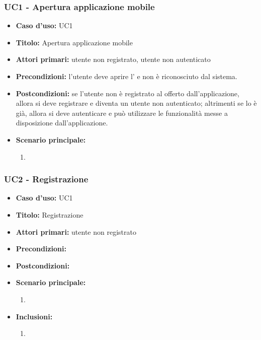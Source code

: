 \documentclass[casi-duso]{subfiles}
\begin{document}
\subsubsection{UC1 - Apertura applicazione mobile}
\label{subsub:uc1utente}
\begin{itemize}
  \item \textbf{Caso d’uso:} UC1 
  \item \textbf{Titolo:} Apertura applicazione mobile
  \item \textbf{Attori primari:} utente non registrato, utente non autenticato
  \item \textbf{Precondizioni:} l'utente deve aprire l' e non è riconosciuto dal sistema.
  \item \textbf{Postcondizioni:} se l'utente non è registrato al  offerto dall'applicazione, allora si deve registrare e diventa un utente non autenticato; 
  altrimenti se lo è già, allora si deve autenticare e può utilizzare le funzionalità messe a disposizione dall'applicazione. 
  \item \textbf{Scenario principale:} 
  \begin{enumerate}
    \item 
  \end{enumerate}  
\end{itemize}

\subsubsection{UC2 - Registrazione}
\label{subsub:uc2utente}
\begin{itemize}
  \item \textbf{Caso d’uso:} UC1 
  \item \textbf{Titolo:} Registrazione
  \item \textbf{Attori primari:} utente non registrato
  \item \textbf{Precondizioni:} 
  \item \textbf{Postcondizioni:} 
  \item \textbf{Scenario principale:} 
  \begin{enumerate}
    \item 
  \end{enumerate}  
  \item \textbf{Inclusioni:} 
  \begin{enumerate}
    \item 
  \end{enumerate}  
\end{itemize}
\end{document}
